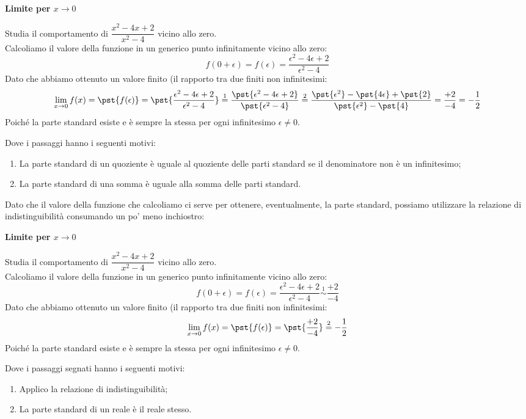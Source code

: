 \begin{esempio}
\textbf{Limite per \(x \to 0\)}

Studia il comportamento di \(\dfrac{x^2-4x+2}{x^2-4} \) vicino allo zero.\\
Calcoliamo il valore della funzione in un generico punto infinitamente 
vicino allo zero:
\[
f(0 + \epsilon) = f(\epsilon) = 
  \frac{\epsilon^2-4\epsilon+2}{\epsilon^2-4}
\]
Dato che abbiamo ottenuto un valore finito (il rapporto tra due finiti non 
infinitesimi:
\[\lim_{x \to 0}f(x) = 
  \pst{f(\epsilon)} = \pst{\frac{\epsilon^2-4\epsilon+2}{\epsilon^2-4}} 
\stackrel{1}{=} \frac{\pst{\epsilon^2-4\epsilon+2}}{\pst{\epsilon^2-4}} 
\stackrel{2}{=} 
  \frac{\pst{\epsilon^2}-\pst{4\epsilon}+\pst{2}}
  {\pst{\epsilon^2}-\pst{4}} =
\frac{+2}{-4} = -\frac{1}{2}\]
Poiché la parte standard esiste e è sempre la stessa per ogni 
infinitesimo \(\epsilon \neq 0\). 

Dove i passaggi hanno i seguenti motivi:
\begin{enumerate} [nosep]
 \item La parte standard di un quoziente è uguale al quoziente delle parti 
standard se il denominatore non è un infinitesimo;
 \item La parte standard di una somma è uguale alla somma delle parti standard.
\end{enumerate}
\end{esempio}

Dato che il valore della funzione che calcoliamo ci serve per ottenere, 
eventualmente, la parte standard, possiamo utilizzare la relazione di 
indistinguibilità consumando un po' meno inchiostro:

\begin{esempio}
\textbf{Limite per \(x \to 0\)}

Studia il comportamento di \(\dfrac{x^2-4x+2}{x^2-4} \) vicino allo zero.\\
Calcoliamo il valore della funzione in un generico punto infinitamente 
vicino allo zero:
\[
f(0 + \epsilon) = f(\epsilon) = 
  \frac{\epsilon^2-4\epsilon+2}{\epsilon^2-4} \stackrel{1}{\sim} 
  \frac{+2}{-4}
\]
Dato che abbiamo ottenuto un valore finito (il rapporto tra due finiti non 
infinitesimi:
\[\lim_{x \to 0}f(x) = 
  \pst{f(\epsilon)} = \pst{\frac{+2}{-4}} \stackrel{2}{=} 
  -\frac{1}{2}\]
Poiché la parte standard esiste e è sempre la stessa per ogni 
infinitesimo \(\epsilon \neq 0\). 

Dove i passaggi segnati hanno i seguenti motivi:
\begin{enumerate} [nosep]
 \item Applico la relazione di indistinguibilità;
 \item La parte standard di un reale è il reale stesso.
\end{enumerate}
\end{esempio}

